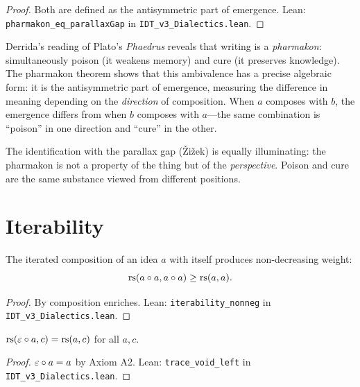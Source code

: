 \begin{proof}
Both are defined as the antisymmetric part of emergence.
Lean: \texttt{pharmakon\_eq\_parallaxGap} in \texttt{IDT\_v3\_Dialectics.lean}.
\end{proof}

\begin{interpretation}
Derrida's reading of Plato's \textit{Phaedrus} reveals that writing is a
\emph{pharmakon}: simultaneously poison (it weakens memory) and cure (it
preserves knowledge). The pharmakon theorem shows that this ambivalence has
a precise algebraic form: it is the antisymmetric part of emergence, measuring
the difference in meaning depending on the \emph{direction} of composition.
When $a$ composes with $b$, the emergence differs from when $b$ composes with
$a$---the same combination is ``poison'' in one direction and ``cure'' in the
other.

The identification with the parallax gap (\v{Z}i\v{z}ek) is equally
illuminating: the pharmakon is not a property of the thing but of the
\emph{perspective}. Poison and cure are the same substance viewed from
different positions.
\end{interpretation}

\section{Iterability}

\begin{theorem}
\label{thm:iterability}
The iterated composition of an idea $a$ with itself produces non-decreasing
weight:
\[
\mathrm{rs}(a \circ a, a \circ a) \geq \mathrm{rs}(a, a).
\]
\end{theorem}

\begin{proof}
By composition enriches.
Lean: \texttt{iterability\_nonneg} in \texttt{IDT\_v3\_Dialectics.lean}.
\end{proof}

\begin{theorem}
\label{thm:trace-void-left}
$\mathrm{rs}(\varepsilon \circ a, c) = \mathrm{rs}(a, c)$ for all $a, c$.
\end{theorem}

\begin{proof}
$\varepsilon \circ a = a$ by Axiom A2.
Lean: \texttt{trace\_void\_left} in \texttt{IDT\_v3\_Dialectics.lean}.
\end{proof}

